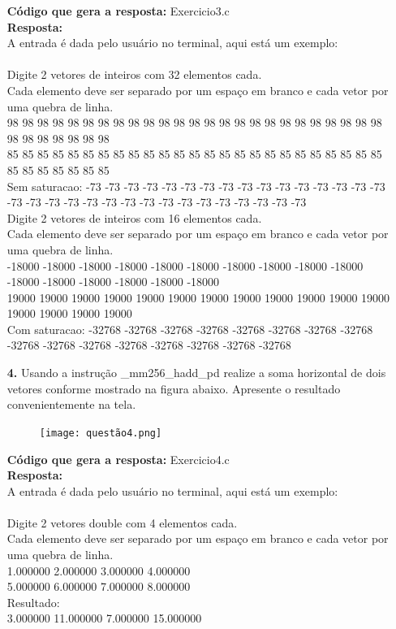 \documentclass[oneside,a4paper,12pt]{article}
\renewcommand{\b}{\textbf}
\begin{document}
\begin{enumerate}
    \b{Código que gera a resposta:} Exercicio3.c\\
    \b{Resposta:}\\
    A entrada é dada pelo usuário no terminal, aqui está um exemplo:\\
    \\
    Digite 2 vetores de inteiros com 32 elementos cada.\\
    Cada elemento deve ser separado por um espaço em branco e cada vetor por uma quebra de linha.\\
    98 98 98 98 98 98 98 98 98 98 98 98 98 98 98 98 98 98 98 98 98 98 98 98 98 98 98 98 98 98 98 98\\
    85 85 85 85 85 85 85 85 85 85 85 85 85 85 85 85 85 85 85 85 85 85 85 85 85 85 85 85 85 85 85 85\\
    Sem saturacao: -73 -73 -73 -73 -73 -73 -73 -73 -73 -73 -73 -73 -73 -73 -73 -73 -73 -73 -73 -73 -73 -73 -73 -73 -73 -73 -73 -73 -73 -73 -73 -73\\
    Digite 2 vetores de inteiros com 16 elementos cada.\\
    Cada elemento deve ser separado por um espaço em branco e cada vetor por uma quebra de linha.\\
    -18000 -18000 -18000 -18000 -18000 -18000 -18000 -18000 -18000 -18000 -18000 -18000 -18000 -18000 -18000 -18000\\
    19000 19000 19000 19000 19000 19000 19000 19000 19000 19000 19000 19000 19000 19000 19000 19000\\
    Com saturacao: -32768 -32768 -32768 -32768 -32768 -32768 -32768 -32768 -32768 -32768 -32768 -32768 -32768 -32768 -32768 -32768\\

    \item[\b{4.}] Usando a instrução \_mm256\_hadd\_pd realize a soma horizontal de dois vetores conforme mostrado na figura abaixo. Apresente o resultado convenientemente na tela.
    
    \begin{figure}[H]
    \centering
    \texttt{[image: questão4.png]}
    \label{fig:Figura1}
    \end{figure}
    
    \b{Código que gera a resposta:} Exercicio4.c\\
    \b{Resposta:}\\
    A entrada é dada pelo usuário no terminal, aqui está um exemplo:\\
    \\
    Digite 2 vetores double com 4 elementos cada.\\
    Cada elemento deve ser separado por um espaço em branco e cada vetor por uma quebra de linha.\\
    1.000000 2.000000 3.000000 4.000000\\
    5.000000 6.000000 7.000000 8.000000\\
    Resultado:\\
    3.000000 11.000000 7.000000 15.000000\\


\end{enumerate}
\end{document}
